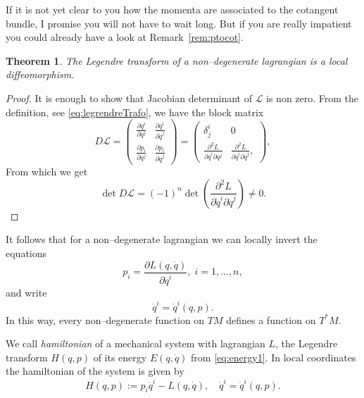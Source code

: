 \documentclass[english,fontsize=11pt,paper=a5,oneside]{scrbook}
\newcommand{\cL}{\mathcal{L}}
\newtheorem{theorem}{Theorem}[chapter]
\theoremstyle{definition}
\begin{document}

If it is not yet clear to you how the momenta are associated to the cotangent bundle, I promise you will not have to wait long. But if you are really impatient you could already have a look at Remark~\ref{rem:ptocot}.

\begin{theorem}
  The Legendre transform of a non--degenerate lagrangian is a local diffeomorphism.
\end{theorem}
\begin{proof}
  It is enough to show that Jacobian determinant of $\cL$ is non zero. From the definition, see \eqref{eq:legrendreTrafo}, we have the block matrix
  \begin{equation}
    D\cL = \begin{pmatrix}
      \frac{\partial q^i}{\partial q^j} & \frac{\partial q^i}{\partial \dot q^j} \\
      \frac{\partial p_i}{\partial q^j} & \frac{\partial p_i}{\partial \dot q^j}
    \end{pmatrix}
    = \begin{pmatrix}
      \delta^i_j                                          & 0                                                          \\
      \frac{\partial^2 L}{\partial \dot q^i \partial q^j} & \frac{\partial^2 L}{\partial \dot q^i  \partial \dot q^j},
    \end{pmatrix},
  \end{equation}
  From which we get
  \begin{equation}
    \det D\cL = (-1)^n \det\left(\frac{\partial^2 L}{\partial \dot q^i  \partial \dot q^j}\right) \neq 0.
  \end{equation}
\end{proof}

It follows that for a non--degenerate lagrangian we can locally invert the equations
\begin{equation}
  p_i = \frac{\partial L(q,\dot q)}{\partial \dot q^i}, \; i=1,\ldots,n,
\end{equation}
and write
\begin{equation}
  \dot q^i = \dot q^i(q,p).
\end{equation}
In this way, every non--degenerate function on $TM$ defines a function on $T^* M$.

\begin{tcolorbox}
  We call \emph{hamiltonian} of a mechanical system with lagrangian $L$, the Legendre transform $H(q,p)$ of its energy $E(q,\dot q)$ from \eqref{eq:energy1}.
  In local coordinates the hamiltonian of the system is given by
  \begin{equation}\label{eq:defH}
    H(q,p) := p_i\dot q^i - L(q, \dot q), \quad \dot q^i = \dot q^i(q,p).
  \end{equation}
\end{tcolorbox}
\end{document}
